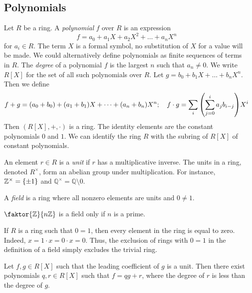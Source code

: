 \subsection{Polynomials}
\begin{definition}
	Let \( R \) be a ring.
	A \textit{polynomial} \( f \) over \( R \) is an expression
	\[ f = a_0 + a_1 X + a_2 X^2 + \dots + a_n X^n \]
	for \( a_i \in R \).
	The term \( X \) is a formal symbol, no substitution of \( X \) for a value will be made.
	We could alternatively define polynomials as finite sequences of terms in \( R \).
	The \textit{degree} of a polynomial \( f \) is the largest \( n \) such that \( a_n \neq 0 \).
	We write \( R[X] \) for the set of all such polynomials over \( R \).
	Let \( g = b_0 + b_1 X + \dots + b_n X^n \).
	Then we define
	\[ f + g = (a_0 + b_0) + (a_1 + b_1) X + \dots + (a_n + b_n) X^n;\quad f \cdot g = \sum_i \qty(\sum_{j=0}^i a_j b_{i-j}) X^i \]
	Then \( (R[X], +, \cdot) \) is a ring.
	The identity elements are the constant polynomials \( 0 \) and \( 1 \).
	We can identify the ring \( R \) with the subring of \( R[X] \) of constant polynomials.
\end{definition}
\begin{definition}
	An element \( r \in R \) is a \textit{unit} if \( r \) has a multiplicative inverse.
	The units in a ring, denoted \( R^\times \), form an abelian group under multiplication.
	For instance, \( \mathbb Z^\times = \qty{\pm 1} \) and \( \mathbb Q^\times = \mathbb Q \setminus \qty{0} \).
\end{definition}
\begin{definition}
	A \textit{field} is a ring where all nonzero elements are units and \( 0 \neq 1 \).
\end{definition}
\begin{example}
	\( \faktor{\mathbb Z}{n\mathbb Z} \) is a field only if \( n \) is a prime.
\end{example}
\begin{remark}
	If \( R \) is a ring such that \( 0 = 1 \), then every element in the ring is equal to zero.
	Indeed, \( x = 1\cdot x = 0\cdot x = 0 \).
	Thus, the exclusion of rings with \( 0 = 1 \) in the definition of a field simply excludes the trivial ring.
\end{remark}
\begin{proposition}
	Let \( f, g \in R[X] \) such that the leading coefficient of \( g \) is a unit.
	Then there exist polynomials \( q, r \in R[X] \) such that \( f = qg + r \), where the degree of \( r \) is less than the degree of \( g \).
\end{proposition}
